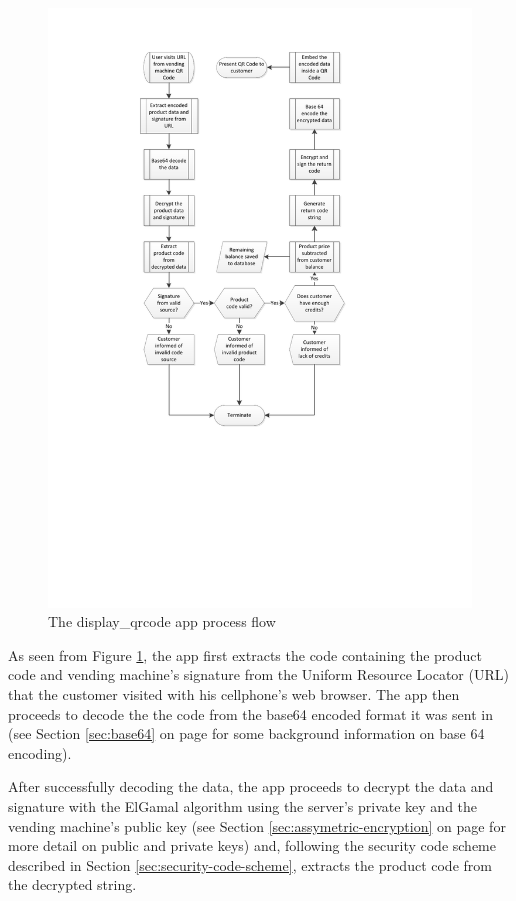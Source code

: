 \begin{figure}
 \centering 
 \includegraphics[clip=true, trim = 0 250 0 50,
 scale=0.7]{qrcode_processflow_server_bak}
 \caption{The display\_qrcode app process flow}
 \label{fig:disp-qrcode}
\end{figure}

As seen from Figure \ref{fig:disp-qrcode}, the app first extracts the code containing the
product code and vending machine's signature from the Uniform Resource Locator (URL) that the
customer visited with his cellphone's web browser. The app then proceeds to decode the
the code from the base64 encoded format it was sent in (see Section \ref{sec:base64} on
page \pageref{sec:base64} for some background information on base 64 encoding).

After successfully decoding the data, the app proceeds to decrypt the data and signature with the ElGamal
algorithm using the server's private key and the vending machine's public key
(see Section \ref{sec:assymetric-encryption} on page \pageref{sec:assymetric-encryption} for more detail on
public and private keys) and, following the security code scheme described in Section \ref{sec:security-code-scheme}, extracts the product
code from the decrypted string.

